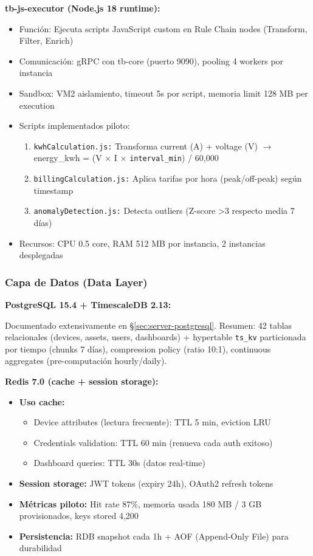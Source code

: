 \textbf{tb-js-executor (Node.js 18 runtime):}

\begin{itemize}
    \item Función: Ejecuta scripts JavaScript custom en Rule Chain nodes (Transform, Filter, Enrich)
    \item Comunicación: gRPC con tb-core (puerto 9090), pooling 4 workers por instancia
    \item Sandbox: VM2 aislamiento, timeout 5s por script, memoria limit 128 MB per execution
    \item Scripts implementados piloto:
    \begin{enumerate}
        \item \texttt{kwhCalculation.js:} Transforma current (A) + voltage (V) $\rightarrow$ energy\_kwh = (V × I × \texttt{interval\_min}) / 60,000
        \item \texttt{billingCalculation.js:} Aplica tarifas por hora (peak/off-peak) según timestamp
        \item \texttt{anomalyDetection.js:} Detecta outliers (Z-score >3 respecto media 7 días)
    \end{enumerate}
    \item Recursos: CPU 0.5 core, RAM 512 MB por instancia, 2 instancias desplegadas
\end{itemize}

\subsubsection{Capa de Datos (Data Layer)}

\textbf{PostgreSQL 15.4 + TimescaleDB 2.13:}

Documentado extensivamente en §\ref{sec:server-postgresql}. Resumen: 42 tablas relacionales (devices, assets, users, dashboards) + hypertable \texttt{ts\_kv} particionada por tiempo (chunks 7 días), compression policy (ratio 10:1), continuous aggregates (pre-computación hourly/daily).

\textbf{Redis 7.0 (cache + session storage):}

\begin{itemize}
    \item \textbf{Uso cache:}
    \begin{itemize}
        \item Device attributes (lectura frecuente): TTL 5 min, eviction LRU
        \item Credentials validation: TTL 60 min (renueva cada auth exitoso)
        \item Dashboard queries: TTL 30s (datos real-time)
    \end{itemize}
    \item \textbf{Session storage:} JWT tokens (expiry 24h), OAuth2 refresh tokens
    \item \textbf{Métricas piloto:} Hit rate 87\%, memoria usada 180 MB / 3 GB provisionados, keys stored 4,200
    \item \textbf{Persistencia:} RDB snapshot cada 1h + AOF (Append-Only File) para durabilidad
\end{itemize}

